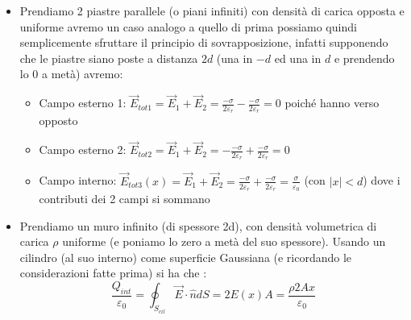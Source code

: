 \documentclass{book}
\begin{document}
\begin{itemize}
   Scegliendo come superficie Gaussiana un cilindro di altezza $h$, aree di base $A_1$ ed $A_2$ e area laterale $A_l$ avremo:
$$
\oint_{S_{cil}} \vec{E}(\vec{r}) \cdot \hat{n} dS = \frac{\sigma A}{\varepsilon_0}   
$$ 
Osservando che le aree di base sono identiche e che l'area laterale è perpendicolare al versore $\hat{n}$ si trova:
$$
\underbrace{\int_{A_l} \vec{E} \cdot \hat{n} dS}_{=0} + \int_{A_1} \vec{E} \cdot \hat{n} dS + \int_{A_2} \vec{E} \cdot  \hat{n} dS = 2E(d)A= \frac{A \sigma}{\varepsilon_0}
$$
troviamo che il campo elettrico è unfiorme che non dipende da d:
$$
E(d) = \frac{\sigma}{2 \varepsilon_0}
$$
\item Prendiamo 2 piastre parallele (o piani infiniti) con densità di carica opposta e uniforme avremo un caso analogo a quello di prima possiamo quindi semplicemente sfruttare il principio di sovrapposizione, infatti supponendo  che le piastre siano poste a distanza $2d$ (una in $-d$ ed una in $d$ e prendendo lo 0 a metà) avremo: 
\begin{itemize}
    \item Campo esterno 1:
    $\vec{E}_{tot1} = \vec{E}_1 + \vec{E}_2 = \frac{-\sigma}{2 \varepsilon_r} - \frac{-\sigma}{2 \varepsilon_r} = 0$ poiché hanno verso opposto
  \item Campo esterno 2:
    $\vec{E}_{tot2} = \vec{E}_1 + \vec{E}_2 = - \frac{-\sigma}{2 \varepsilon_r} + \frac{-\sigma}{2 \varepsilon_r} = 0$
 \item Campo interno:
    $\vec{E}_{tot3}(x) = \vec{E}_1 + \vec{E}_2 = \frac{-\sigma}{2 \varepsilon_r} + \frac{-\sigma}{2 \varepsilon_r} = \frac{\sigma}{\varepsilon_0}$
     (con $|x|< d$) dove i contributi dei 2 campi si sommano 
     \end{itemize}
     \item Prendiamo un muro infinito (di spessore 2d), con densità volumetrica di carica $\rho$ uniforme (e poniamo lo zero a metà del suo spessore).
     Usando un cilindro (al suo interno) come superficie Gaussiana (e ricordando le considerazioni fatte prima) si ha che :
     $$
     \frac{Q_{int}}{\varepsilon_0} = \oint_{S_{cil}} \vec{E}\cdot\hat{n}dS =2 E(x) A = \frac{\rho 2A x}{\varepsilon_0}
     $$


\end{itemize}
\end{document}
